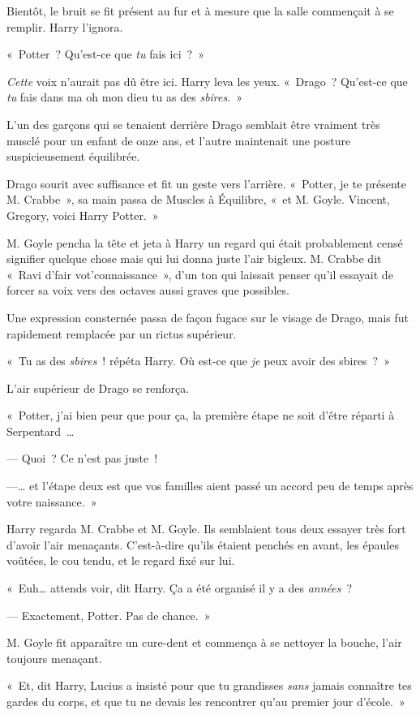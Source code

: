 Bientôt, le bruit se fit présent au fur et à mesure que la salle commençait à se remplir. Harry l'ignora.

«~Potter~? Qu'est-ce que \emph{tu} fais ici~?~»

\emph{Cette} voix n'aurait pas dû être ici.
Harry leva les yeux. «~Drago~? Qu'est-ce que \emph{tu} fais dans ma oh mon dieu tu as des \emph{sbires}.~»

L'un des garçons qui se tenaient derrière Drago semblait être vraiment très musclé pour un enfant de onze ans, et l'autre maintenait une posture suspicieusement équilibrée.

Drago sourit avec suffisance et fit un geste vers l'arrière.
«~Potter, je te présente M. Crabbe~», sa main passa de Muscles à Équilibre, «~et M. Goyle.
Vincent, Gregory, voici Harry Potter.~»

M. Goyle pencha la tête et jeta à Harry un regard qui était probablement censé signifier quelque chose mais qui lui donna juste l'air bigleux.
M. Crabbe dit «~Ravi d'fair vot'connaissance~», d'un ton qui laissait penser qu'il essayait de forcer sa voix vers des octaves aussi graves que possibles.

Une expression consternée passa de façon fugace sur le visage de Drago, mais fut rapidement remplacée par un rictus supérieur.

«~Tu as des \emph{sbires}~! répéta Harry. Où est-ce que \emph{je} peux avoir des sbires~?~»

L'air supérieur de Drago se renforça.

«~Potter, j'ai bien peur que pour ça, la première étape ne soit d'être réparti à Serpentard~…

--- Quoi~? Ce n'est pas juste~!

---… et l'étape deux est que vos familles aient passé un accord peu de temps après votre naissance.~»

Harry regarda M. Crabbe et M. Goyle. Ils semblaient tous deux essayer très fort d'avoir l'air menaçants. C'est-à-dire qu'ils étaient penchés en avant, les épaules voûtées, le cou tendu, et le regard fixé sur lui.

«~Euh… attends voir, dit Harry. Ça a été organisé il y a des \emph{années}~?

--- Exactement, Potter. Pas de chance.~»

M. Goyle fit apparaître un cure-dent et commença à se nettoyer la bouche, l'air toujours menaçant.

«~Et, dit Harry, Lucius a insisté pour que tu grandisses \emph{sans} jamais connaître tes gardes du corps, et que tu ne devais les rencontrer qu'au premier jour d'école.~»

